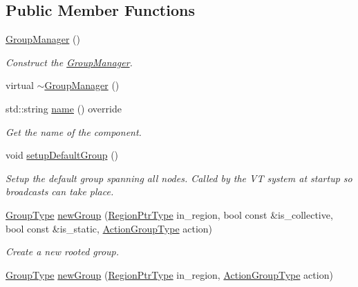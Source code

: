 \subsection*{Public Member Functions}
\begin{DoxyCompactItemize}
\item 
\hyperlink{structvt_1_1group_1_1_group_manager_acfab15afbf80d7b0aa8d95171167b251}{Group\+Manager} ()
\begin{DoxyCompactList}\small\item\em Construct the \hyperlink{structvt_1_1group_1_1_group_manager}{Group\+Manager}. \end{DoxyCompactList}\item 
virtual \hyperlink{structvt_1_1group_1_1_group_manager_a87c2b3dc934de17d0ec1372957b234e5}{$\sim$\+Group\+Manager} ()
\item 
std\+::string \hyperlink{structvt_1_1group_1_1_group_manager_a46802e85936e68f9bebc844af1793da3}{name} () override
\begin{DoxyCompactList}\small\item\em Get the name of the component. \end{DoxyCompactList}\item 
void \hyperlink{structvt_1_1group_1_1_group_manager_ac0eb535f215f0edf1bed601b4338220f}{setup\+Default\+Group} ()
\begin{DoxyCompactList}\small\item\em Setup the default group spanning all nodes. Called by the VT system at startup so broadcasts can take place. \end{DoxyCompactList}\item 
\hyperlink{namespacevt_a27b5e4411c9b6140c49100e050e2f743}{Group\+Type} \hyperlink{structvt_1_1group_1_1_group_manager_aaf9941faced23021a420185203219149}{new\+Group} (\hyperlink{structvt_1_1group_1_1_group_manager_a9192e585fc2f99bfd5a6ff65fc21c40b}{Region\+Ptr\+Type} in\+\_\+region, bool const \&is\+\_\+collective, bool const \&is\+\_\+static, \hyperlink{structvt_1_1group_1_1_group_manager_ae871c5871ad62b530220009c1ee4d4b9}{Action\+Group\+Type} action)
\begin{DoxyCompactList}\small\item\em Create a new rooted group. \end{DoxyCompactList}\item 
\hyperlink{namespacevt_a27b5e4411c9b6140c49100e050e2f743}{Group\+Type} \hyperlink{structvt_1_1group_1_1_group_manager_af2986f6eacd693d9906cb397e6e2a706}{new\+Group} (\hyperlink{structvt_1_1group_1_1_group_manager_a9192e585fc2f99bfd5a6ff65fc21c40b}{Region\+Ptr\+Type} in\+\_\+region, \hyperlink{structvt_1_1group_1_1_group_manager_ae871c5871ad62b530220009c1ee4d4b9}{Action\+Group\+Type} action)

\end{DoxyCompactItemize}
